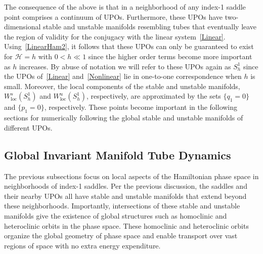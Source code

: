 \documentclass[11pt]{article}
\numberwithin{equation}{section}
\theoremstyle{plain}
\begin{document}
The consequence of the above is that in a neighborhood of any index-1 saddle point comprises a continuum of UPOs. Furthermore, these UPOs have two-dimensional stable and unstable manifolds resembling tubes that eventually leave the region of validity for the conjugacy with the linear system~\eqref{Linear}. Using~\eqref{LinearHam2}, it follows that these UPOs can only be guaranteed to exist for $\mathcal{H} = h$ with $0 < h \ll 1$ since the higher order terms become more important as $h$ increases. By abuse of notation we will refer to these UPOs again as $S^1_h$ since the UPOs of~\eqref{Linear} and~\eqref{Nonlinear} lie in one-to-one correspondence when $h$ is small. Moreover, the local components of the stable and unstable manifolds, $W^s_\mathrm{loc}(S^1_h)$ and $W^u_\mathrm{loc}(S^1_h)$, respectively, are approximated by the sets $\{q_1 = 0\}$ and $\{p_1 = 0\}$, respectively. These points become important in the following sections for numerically following the global stable and unstable manifolds of different UPOs.       


\subsection{Global Invariant Manifold Tube Dynamics}

The previous subsections focus on local aspects of the Hamiltonian phase space in neighborhoods of index-1 saddles. Per the previous discussion, the saddles and their nearby UPOs all have stable and unstable manifolds that extend beyond these neighborhoods. Importantly, intersections of these stable and unstable manifolds give the existence of global structures such as homoclinic and heteroclinic orbits in the phase space. These homoclinic and heteroclinic orbits organize the global geometry of phase space and enable transport over vast regions of space with no extra energy expenditure. 
\end{document}
